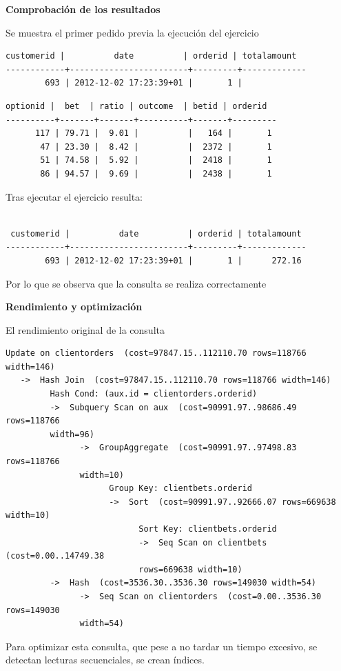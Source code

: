 \documentclass{article}
\begin{document}
\textbf{Comprobación de los resultados}

Se muestra el primer pedido previa la ejecución del ejercicio
\lstset{basicstyle=\small,style=sql}
\begin{lstlisting}[style=sql]
 customerid |          date          | orderid | totalamount
------------+------------------------+---------+-------------
        693 | 2012-12-02 17:23:39+01 |       1 |
\end{lstlisting}
\begin{lstlisting}[style=sql]
 optionid |  bet  | ratio | outcome  | betid | orderid
----------+-------+-------+----------+-------+---------
      117 | 79.71 |  9.01 |          |   164 |       1
       47 | 23.30 |  8.42 |          |  2372 |       1
       51 | 74.58 |  5.92 |          |  2418 |       1
       86 | 94.57 |  9.69 |          |  2438 |       1
\end{lstlisting} 
Tras ejecutar el ejercicio resulta:
\begin{lstlisting}[style=sql]

 customerid |          date          | orderid | totalamount
------------+------------------------+---------+-------------
        693 | 2012-12-02 17:23:39+01 |       1 |      272.16
\end{lstlisting}
Por lo que se observa que la consulta se realiza correctamente
$$\;$$

\textbf{Rendimiento y optimización}

El rendimiento original de la consulta
\lstset{basicstyle=\small,style=sql}
\begin{lstlisting}[style=sql]
 Update on clientorders  (cost=97847.15..112110.70 rows=118766 width=146)
   ->  Hash Join  (cost=97847.15..112110.70 rows=118766 width=146)
         Hash Cond: (aux.id = clientorders.orderid)
         ->  Subquery Scan on aux  (cost=90991.97..98686.49 rows=118766 
         width=96)
               ->  GroupAggregate  (cost=90991.97..97498.83 rows=118766 
               width=10)
                     Group Key: clientbets.orderid
                     ->  Sort  (cost=90991.97..92666.07 rows=669638 width=10)
                           Sort Key: clientbets.orderid
                           ->  Seq Scan on clientbets  (cost=0.00..14749.38 
                           rows=669638 width=10)
         ->  Hash  (cost=3536.30..3536.30 rows=149030 width=54)
               ->  Seq Scan on clientorders  (cost=0.00..3536.30 rows=149030 
               width=54)

\end{lstlisting}
Para optimizar esta consulta, que pese a no tardar un tiempo excesivo, se detectan lecturas secuenciales, se crean índices.
\end{document}
